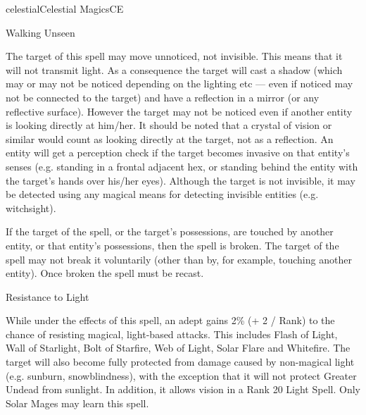 \begin{College}[1.3]{celestial}{Celestial Magics}{CE}
\begin{spell}[G-8]{Walking Unseen}

\begin{effects}
The target of this spell may move unnoticed, not invisible.  This
means that it will not transmit light. As a consequence the target
will cast a shadow (which may or may not be noticed depending on the
lighting etc — even if noticed may not be connected to the target) and
have a reflection in a mirror (or any reflective surface).  However
the target may not be noticed even if another entity is looking
directly at him/her.  It should be noted that a crystal of vision or
similar would count as looking directly at the target, not as a
reflection.  An entity will get a perception check if the target
becomes invasive on that entity’s senses (e.g. standing in a frontal
adjacent hex, or standing behind the entity with the target’s hands
over his/her eyes). Although the target is not invisible, it may be
detected using any magical means for detecting invisible entities
(e.g. witchsight).

If the target of the spell, or the target’s possessions, are touched
by another entity, or that entity’s possessions, then the spell is
broken. The target of the spell may not break it voluntarily (other
than by, for example, touching another entity). Once broken the spell
must be recast.
\end{effects}
\end{spell}

\begin{spell}[G-9 Solar]{Resistance to Light}

\begin{effects}
While under the effects of this spell, an adept gains 2\% (+ 2 / Rank)
to the chance of resisting magical, light-based attacks.  This
includes Flash of Light, Wall of Starlight, Bolt of Starfire, Web of
Light, Solar Flare and Whitefire. The target will also become fully
protected from damage caused by non-magical light (e.g.  sunburn,
snowblindness), with the exception that it will not protect Greater
Undead from sunlight.  In addition, it allows vision in a Rank 20
Light Spell. Only Solar Mages may learn this spell.
\end{effects}
\end{spell}


\end{College}
